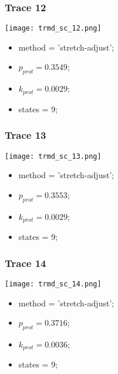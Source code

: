 \subsubsection{Trace 12}
\begin{minipage}[c]{0.7\textwidth}
    \texttt{[image: trmd\_sc\_12.png]}
\end{minipage}
\hfill
\begin{minipage}[c]{0.45\textwidth}
    \begin{itemize}
        \item method = 'stretch-adjust';
        \item $p_{prot}=0.3549$;
        \item $k_{prot}=0.0029$;
        \item states = 9;
    \end{itemize}
\end{minipage}

\subsubsection{Trace 13}
\begin{minipage}[c]{0.7\textwidth}
    \texttt{[image: trmd\_sc\_13.png]}
\end{minipage}
\hfill
\begin{minipage}[c]{0.45\textwidth}
    \begin{itemize}
        \item method = 'stretch-adjust';
        \item $p_{prot}=0.3553$;
        \item $k_{prot}=0.0029$;
        \item states = 9;
    \end{itemize}
\end{minipage}

\subsubsection{Trace 14}
\begin{minipage}[c]{0.7\textwidth}
    \texttt{[image: trmd\_sc\_14.png]}
\end{minipage}
\hfill
\begin{minipage}[c]{0.45\textwidth}
    \begin{itemize}
        \item method = 'stretch-adjust';
        \item $p_{prot}=0.3716$;
        \item $k_{prot}=0.0036$;
        \item states = 9;
    \end{itemize}
\end{minipage}

